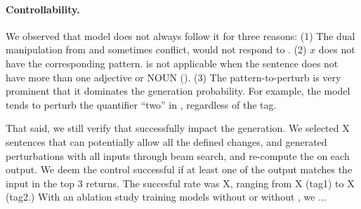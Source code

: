 \paragraph{Controllability.}
We observed that model does not always follow it for three reasons:
(1) The dual manipulation from \tagstrs and \BLANK sometimes conflict, \eg {} would not respond to .
(2) $x$ does not have the corresponding pattern.  is not applicable when the sentence does not have more than one adjective or NOUN (\eg {}).
(3) The pattern-to-perturb is very prominent that it dominates the generation probability. 
For example, the model tends to perturb the quantifier ``two'' in , regardless of the tag.

That said, we still verify that \tagstrs successfully impact the generation.
We selected X sentences that can potentially allow all the defined changes, and generated perturbations with all \tagstr inputs through beam search, and re-compute the \tagstr on each output.
We deem the control successful if at least one of the output \tagstr matches the input in the top 3 returns.
The succesful rate was X, ranging from X (tag1) to X (tag2.)
With an ablation study training models without \tagstr or without \BLANK, we ...







